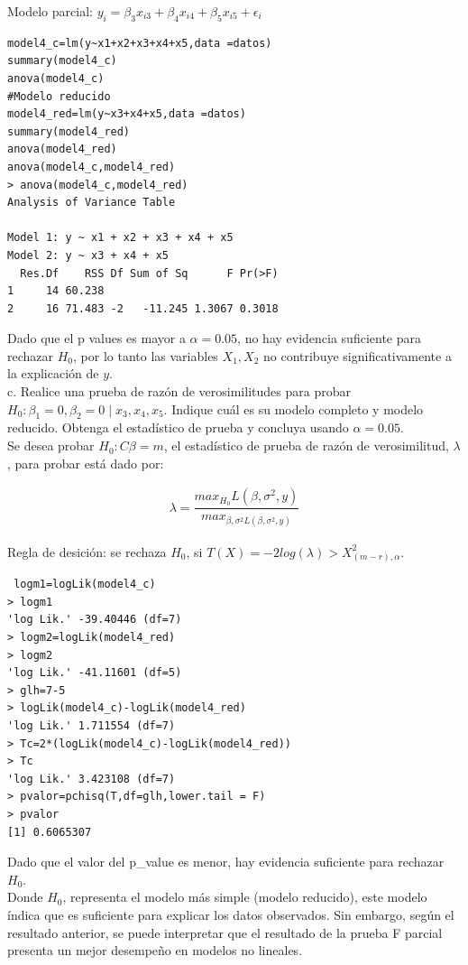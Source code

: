 \documentclass[12pt,a4paper]{report}
\begin{document}
 Modelo parcial: $y_i =\beta_3 x_{i3} + \beta_4 x_{i4} + \beta_5 x_{i5} + \epsilon_i$\\

 
 
 \begin{verbatim}model4_c=lm(y~x1+x2+x3+x4+x5,data =datos)
summary(model4_c)
anova(model4_c)
#Modelo reducido
model4_red=lm(y~x3+x4+x5,data =datos)
summary(model4_red)
anova(model4_red)
anova(model4_c,model4_red)
> anova(model4_c,model4_red)
Analysis of Variance Table

Model 1: y ~ x1 + x2 + x3 + x4 + x5
Model 2: y ~ x3 + x4 + x5
  Res.Df    RSS Df Sum of Sq      F Pr(>F)
1     14 60.238                           
2     16 71.483 -2   -11.245 1.3067 0.3018
\end{verbatim}

Dado que el p values es mayor a $\alpha=0.05$, no hay evidencia suficiente para rechazar $H_0$, por lo tanto las variables $X_1,X_2$ no contribuye significativamente a la explicación de $y$.\\


c. Realice una prueba de razón de verosimilitudes para probar \(H_0 : \beta_1 = 0, \beta_2 = 0 \mid x_3, x_4, x_5\). Indique cuál es su modelo completo y modelo reducido. Obtenga el estadístico de prueba y concluya usando \(\alpha = 0.05\).\\

Se desea probar $H_0:C\beta=m$, el estadístico de prueba de razón de verosimilitud, $\lambda$, para probar está dado por:

\begin{eqnarray*}
	\lambda=\dfrac{max_{H_0}L\left(\beta,\sigma^{2},y\right)}{max_{\beta,\sigma^{2} L \left(\beta,\sigma^{2},y\right)}}
\end{eqnarray*}

Regla de desición: se rechaza $H_0$, si $T(X)=-2log(\lambda) > X^{2}_{(m-r),\alpha}$. 


 \begin{verbatim} logm1=logLik(model4_c)
> logm1
'log Lik.' -39.40446 (df=7)
> logm2=logLik(model4_red)
> logm2
'log Lik.' -41.11601 (df=5)
> glh=7-5
> logLik(model4_c)-logLik(model4_red)
'log Lik.' 1.711554 (df=7)
> Tc=2*(logLik(model4_c)-logLik(model4_red))
> Tc
'log Lik.' 3.423108 (df=7)
> pvalor=pchisq(T,df=glh,lower.tail = F)
> pvalor
[1] 0.6065307
\end{verbatim}



Dado que el valor del p\_value es menor, hay evidencia suficiente para rechazar $H_{0}$. \\
Donde $H_0$, representa el modelo más simple (modelo reducido), este modelo índica que es suficiente para explicar los datos observados. Sin embargo, según el resultado anterior, se puede interpretar que el resultado de la prueba F parcial presenta un mejor desempeño en modelos no lineales. 
\end{document}
